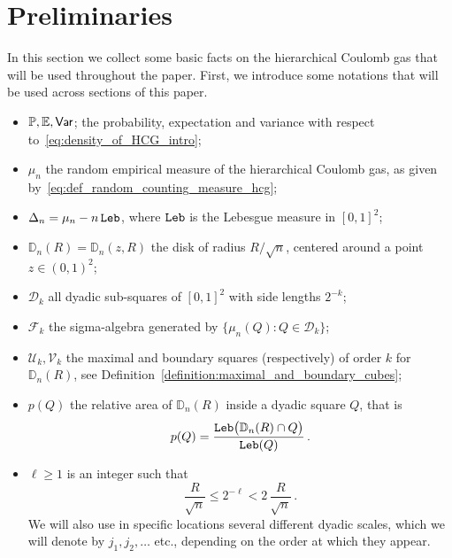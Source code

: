 \documentclass[11pt]{amsart}
\theoremstyle{definition}
\theoremstyle{remark}
\numberwithin{equation}{section}
\newcommand{\bD}{\mathbb D}
\newcommand{\bP}{\mathbb P}
\newcommand{\bE}{\mathbb E}
\newcommand{\Var}{{\sf Var}}
\begin{document}
	\section{Preliminaries}
	\label{sec:preliminaries}
	In this section we collect some basic facts on the hierarchical Coulomb gas that will be used throughout the paper. First, we introduce some notations that will be used across sections of this paper. 
	\begin{itemize}
		\item $\bP,\bE,\Var$; the probability, expectation and variance with respect to~\eqref{eq:density_of_HCG_intro};	
		\item $\mu_n$ the random empirical measure of the hierarchical Coulomb gas, as given by~\eqref{eq:def_random_counting_measure_hcg};
		\item $\Delta_n = \mu_n - n \, {\tt Leb}$, where ${\tt Leb}$ is the Lebesgue measure in $[0,1]^2$;
		\item $\bD_n(R) = \bD_n(z,R)$ the disk of radius $R/\sqrt{n}$, centered around a point $z\in (0,1)^2$;
		\item $\mathcal{D}_{k}$ all dyadic sub-squares of $[0,1]^2$ with side lengths $2^{-k}$;
		\item $\mathcal{F}_k$ the sigma-algebra generated by $\big\{ \mu_n(Q) : Q\in \mathcal{D}_k \big\}$;
		\item $\mathcal{U}_k,\mathcal{V}_k$ the maximal and boundary squares (respectively) of order $k$ for $\bD_n(R)$, see Definition~\ref{definition:maximal_and_boundary_cubes};
		\item $p(Q)$ the relative area of $\bD_n(R)$ inside a dyadic square $Q$, that is 
		\[
		p(Q) = \frac{{\tt Leb}\big(\bD_n(R) \cap Q\big)}{{\tt Leb}(Q)} \, .
		\]
		
		\item $\ell\ge 1$ is an integer such that 
		\[
		\frac{R}{\sqrt{n}} \le 2^{-\ell} < 2\, \frac{R}{\sqrt{n}} \, .
		\]
		We will also use in specific locations several different dyadic scales, which we will denote by $j_1,j_2,\ldots$ etc., depending on the order at which they appear. 
	\end{itemize}  
\end{document}
